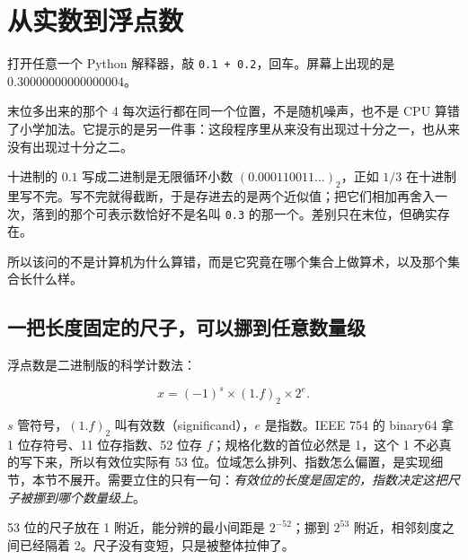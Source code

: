 \section{从实数到浮点数}
\label{sec:08-Numerical-Analysis/01-Floating-Point-and-Error/01}

打开任意一个 Python 解释器，敲 \texttt{0.1 + 0.2}，回车。屏幕上出现的是 \(0.30000000000000004\)。

末位多出来的那个 4 每次运行都在同一个位置，不是随机噪声，也不是 CPU 算错了小学加法。它提示的是另一件事：这段程序里从来没有出现过十分之一，也从来没有出现过十分之二。

十进制的 \(0.1\) 写成二进制是无限循环小数 \((0.000110011\ldots)_2\)，正如 \(1/3\) 在十进制里写不完。写不完就得截断，于是存进去的是两个近似值；把它们相加再舍入一次，落到的那个可表示数恰好不是名叫 \texttt{0.3} 的那一个。差别只在末位，但确实存在。

所以该问的不是计算机为什么算错，而是它究竟在哪个集合上做算术，以及那个集合长什么样。

\subsection{一把长度固定的尺子，可以挪到任意数量级}

浮点数是二进制版的科学计数法：

\[
x=(-1)^{s}\times(1.f)_2\times 2^{e}.
\]

\(s\) 管符号，\((1.f)_2\) 叫有效数（significand），\(e\) 是指数。IEEE 754 的 binary64 拿 1 位存符号、11 位存指数、52 位存 \(f\)；规格化数的首位必然是 1，这个 1 不必真的写下来，所以有效位实际有 53 位。位域怎么排列、指数怎么偏置，是实现细节，本节不展开。需要立住的只有一句：\emph{有效位的长度是固定的，指数决定这把尺子被挪到哪个数量级上}。

53 位的尺子放在 1 附近，能分辨的最小间距是 \(2^{-52}\)；挪到 \(2^{53}\) 附近，相邻刻度之间已经隔着 2。尺子没有变短，只是被整体拉伸了。

